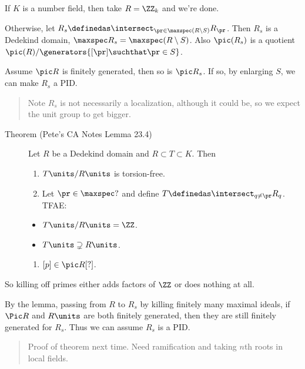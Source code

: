 If \(K\) is a number field, then take \(R = \ZZ_k\) and we're done.

Otherwise, let
\(R_s \definedas \intersect_{\pr \in \maxspec(R\setminus S)} R_{\pr}\).
Then \(R_s\) is a Dedekind domain,
\(\maxspec R_s = \maxspec(R\setminus S)\). Also \(\pic(R_s)\) is a
quotient \(\pic(R) / \generators{[\pr] \suchthat \pr \in S}\).

Assume \(\pic R\) is finitely generated, then so is \(\pic R_s\). If so,
by enlarging \(S\), we can make \(R_s\) a PID.

\begin{quote}
Note \(R_s\) is not necessarily a localization, although it could be, so
we expect the unit group to get bigger.
\end{quote}

\begin{description}
\item[Theorem (Pete's CA Notes Lemma 23.4)]
Let \(R\) be a Dedekind domain and \(R\subset T \subset K\). Then

\begin{enumerate}
\def\labelenumi{\alph{enumi}.}
\item
  \(T\units/R\units\) is torsion-free.
\item
  Let \(\pr \in \maxspec ?\) and define
  \(T \definedas \intersect_{q\neq \pr} R_q\). TFAE:
\end{enumerate}

\begin{itemize}
\tightlist
\item
  \(T\units / R\units = \ZZ\).
\item
  \(T\units \supsetneq R\units\).
\end{itemize}

\begin{enumerate}
\def\labelenumi{\alph{enumi}.}
\setcounter{enumi}{2}
\tightlist
\item
  \([p] \in \pic R[?]\).
\end{enumerate}
\end{description}

So killing off primes either adds factors of \(\ZZ\) or does nothing at
all.

By the lemma, passing from \(R\) to \(R_s\) by killing finitely many
maximal ideals, if \(\Pic R\) and \(R\units\) are both finitely
generated, then they are still finitely generated for \(R_s\). Thus we
can assume \(R_s\) is a PID.

\begin{quote}
Proof of theorem next time. Need ramification and taking \(n\)th roots
in local fields.
\end{quote}

